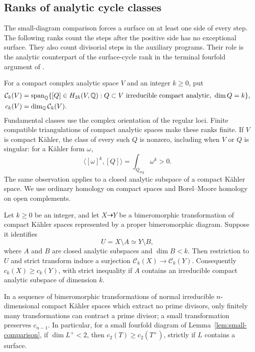 \subsection{Ranks of analytic cycle classes}

The small-diagram comparison forces a surface on at least one side of
every step.  The following ranks count the steps after the positive
side has no exceptional surface.  They also count divisorial steps in
the auxiliary programs.  Their role is the analytic counterpart of the
surface-cycle rank in the terminal fourfold argument of
\cite[Theorem~5-1-15 and Lemma~5-1-17]{KawamataMatsudaMatsuki1987}.

For a compact complex analytic space $V$ and an integer $k\geq0$, put
\[
 \begin{split}
 \mathcal C_k(V)&=\operatorname{span}_{\mathbb{Q}}
 \{[Q]\in H_{2k}(V,\mathbb{Q}):
       Q\subset V\text{ irreducible compact analytic},\ \dim Q=k\},\\
 c_k(V)&=\dim_{\mathbb{Q}}\mathcal C_k(V).
 \end{split}
\]
Fundamental classes use the complex orientation of the regular loci.
Finite compatible triangulations of compact analytic spaces make these
ranks finite.  If $V$ is compact K\"ahler, the class of every such $Q$
is nonzero, including when $V$ or $Q$ is singular: for a K\"ahler form
$\omega$,
\[
 \langle[\omega]^k,[Q]\rangle=\int_{Q_{\mathrm{reg}}}\omega^k>0.
\]
The same observation applies to a closed analytic subspace of a
compact K\"ahler space.  We use ordinary homology on compact spaces
and Borel--Moore homology on open complements.

\begin{lemma}\label{lem:cycle-loss}
Let $k\geq0$ be an integer, and let $X\dashrightarrow Y$ be a
bimeromorphic transformation of compact K\"ahler spaces represented by
a proper bimeromorphic diagram.
Suppose it identifies
\[
 U=X\setminus A\simeq Y\setminus B,
\]
where $A$ and $B$ are closed analytic subspaces and $\dim B<k$.
Then restriction to $U$ and strict transform induce a surjection
$\mathcal C_k(X)\to\mathcal C_k(Y)$.  Consequently
$c_k(X)\geq c_k(Y)$, with strict inequality if $A$ contains an
irreducible compact analytic subspace of dimension $k$.

In a sequence of bimeromorphic transformations of normal irreducible $n$-dimensional
compact K\"ahler spaces which extract no prime divisors, only finitely
many transformations can contract a prime divisor; a small
transformation preserves $c_{n-1}$.  In particular, for a small
fourfold diagram of Lemma~\ref{lem:small-comparison}, if $\dim L^+<2$,
then $c_2(T)\geq c_2(T^+)$, strictly if $L$ contains a surface.
\end{lemma}

